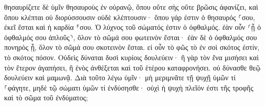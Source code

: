\documentclass{openreader}
\begin{document}
θησαυρίζετε δὲ ὑμῖν θησαυροὺς ἐν οὐρανῷ, ὅπου οὔτε σὴς οὔτε βρῶσις ἀφανίζει, καὶ ὅπου κλέπται οὐ διορύσσουσιν οὐδὲ κλέπτουσιν· 
ὅπου γάρ ἐστιν ὁ θησαυρός ⸀σου, ἐκεῖ ἔσται καὶ ἡ καρδία ⸁σου. 
Ὁ λύχνος τοῦ σώματός ἐστιν ὁ ὀφθαλμός. ἐὰν οὖν ⸂ᾖ ὁ ὀφθαλμός σου ἁπλοῦς⸃, ὅλον τὸ σῶμά σου φωτεινὸν ἔσται· 
ἐὰν δὲ ὁ ὀφθαλμός σου πονηρὸς ᾖ, ὅλον τὸ σῶμά σου σκοτεινὸν ἔσται. εἰ οὖν τὸ φῶς τὸ ἐν σοὶ σκότος ἐστίν, τὸ σκότος πόσον. 
Οὐδεὶς δύναται δυσὶ κυρίοις δουλεύειν· ἢ γὰρ τὸν ἕνα μισήσει καὶ τὸν ἕτερον ἀγαπήσει, ἢ ἑνὸς ἀνθέξεται καὶ τοῦ ἑτέρου καταφρονήσει. οὐ δύνασθε θεῷ δουλεύειν καὶ μαμωνᾷ. 
Διὰ τοῦτο λέγω ὑμῖν· μὴ μεριμνᾶτε τῇ ψυχῇ ὑμῶν τί ⸀φάγητε, μηδὲ τῷ σώματι ὑμῶν τί ἐνδύσησθε· οὐχὶ ἡ ψυχὴ πλεῖόν ἐστι τῆς τροφῆς καὶ τὸ σῶμα τοῦ ἐνδύματος; 
\end{document}
